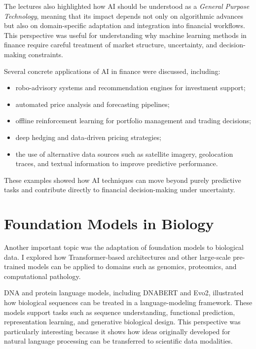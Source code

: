\documentclass[11pt,a4paper]{article}
\begin{document}
The lectures also highlighted how AI should be understood as a \textit{General Purpose Technology}, meaning that its impact depends not only on algorithmic advances but also on domain-specific adaptation and integration into financial workflows. This perspective was useful for understanding why machine learning methods in finance require careful treatment of market structure, uncertainty, and decision-making constraints.

Several concrete applications of AI in finance were discussed, including:
\begin{itemize}
    \item robo-advisory systems and recommendation engines for investment support;
    \item automated price analysis and forecasting pipelines;
    \item offline reinforcement learning for portfolio management and trading decisions;
    \item deep hedging and data-driven pricing strategies;
    \item the use of alternative data sources such as satellite imagery, geolocation traces, and textual information to improve predictive performance.
\end{itemize}

These examples showed how AI techniques can move beyond purely predictive tasks and contribute directly to financial decision-making under uncertainty.

\section{Foundation Models in Biology}
Another important topic was the adaptation of foundation models to biological data. I explored how Transformer-based architectures and other large-scale pre-trained models can be applied to domains such as genomics, proteomics, and computational pathology.

DNA and protein language models, including DNABERT \cite{ji2021dnabert} and Evo2, illustrated how biological sequences can be treated in a language-modeling framework. These models support tasks such as sequence understanding, functional prediction, representation learning, and generative biological design. This perspective was particularly interesting because it shows how ideas originally developed for natural language processing can be transferred to scientific data modalities.
\end{document}
